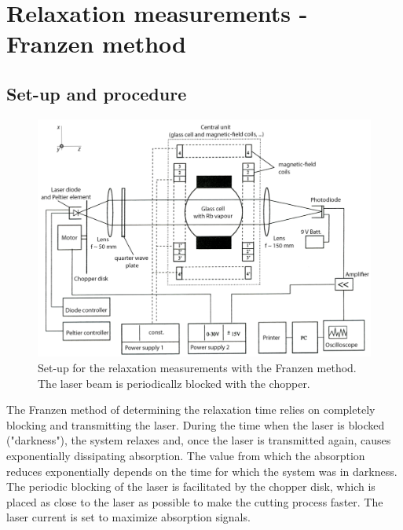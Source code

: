 \section{Relaxation measurements - Franzen method}
\subsection{Set-up and procedure}
\begin{figure}
\centering
\includegraphics[width=1.0\linewidth]{graphics/franzensetup}
\caption[Set-up relaxation measurements - Franzen]{Set-up for the relaxation measurements with the Franzen method. The laser beam is periodicallz blocked with the chopper.\cite{anleitung}}
\label{fig:franzensetup}
\end{figure}
The Franzen method of determining the relaxation time relies on completely blocking and transmitting the laser. During the time when the laser is blocked ("darkness"), the system relaxes and, once the laser is transmitted again, causes exponentially dissipating absorption. The value from which the absorption reduces exponentially depends on the time for which the system was in darkness. The periodic blocking of the laser is facilitated by the chopper disk, which is placed as close to the laser as possible to make the cutting process faster. The laser current is set to maximize absorption signals.

